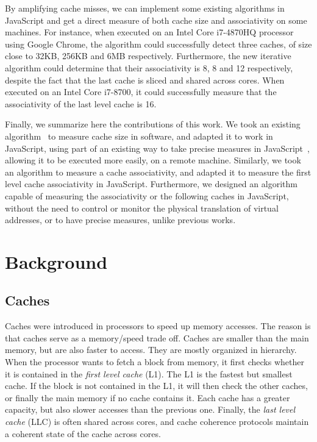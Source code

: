 \documentclass[a4paper,11pt,oneside]{report}
\begin{document}

By amplifying cache misses, we can implement some existing algorithms in JavaScript and get a direct measure of both cache size and associativity on some machines. For instance, when executed on an Intel Core i7-4870HQ processor using Google Chrome, the algorithm could successfully detect three caches, of size close to 32KB, 256KB and 6MB respectively. Furthermore, the new iterative algorithm could determine that their associativity is 8, 8 and 12 respectively, despite the fact that the last cache is sliced and shared across cores. When executed on an Intel Core i7-8700, it could successfully measure that the associativity of the last level cache is 16.


Finally, we summarize here the contributions of this work. We took an existing algorithm~\cite{abel} to measure cache size in software, and adapted it to work in JavaScript, using part of an existing way to take precise measures in JavaScript~\cite{aleph_spectre}, allowing it to be executed more easily, on a remote machine. Similarly, we took an algorithm to measure a cache associativity, and adapted it to measure the first level cache associativity in JavaScript. Furthermore, we designed an algorithm capable of measuring the associativity or the following caches in JavaScript, without the need to control or monitor the physical translation of virtual addresses, or to have precise measures, unlike previous works.

\chapter{Background}



\section{Caches}


Caches were introduced in processors to speed up memory accesses. The reason is that caches serve as a memory/speed trade off. Caches are smaller than the main memory, but are also faster to access. They are mostly organized in hierarchy. When the processor wants to fetch a block from memory, it first checks whether it is contained in the \emph{first level cache} (L1). The L1 is the fastest but smallest cache. If the block is not contained in the L1, it will then check the other caches, or finally the main memory if no cache contains it. Each cache has a greater capacity, but also slower accesses than the previous one. Finally, the \emph{last level cache} (LLC) is often shared across cores, and cache coherence protocols maintain a coherent state of the cache across cores.
\end{document}

